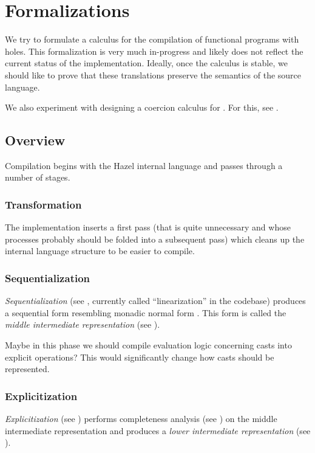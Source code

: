 \documentclass[index.tex]{subfiles}
\begin{document}
\section{Formalizations}
\label{formalization}
We try to formulate a calculus for the compilation of functional programs with holes. This
formalization is very much in-progress and likely does not reflect the current status of the
implementation. Ideally, once the calculus is stable, we should like to prove that these
translations preserve the semantics of the source language.

We also experiment with designing a coercion calculus for \Hazelnut{}. For this, see
.

\subsection{Overview}
Compilation begins with the Hazel internal language and passes through a number of stages.

\subsubsection{Transformation}
The implementation inserts a first pass (that is quite unnecessary and whose processes probably
should be folded into a subsequent pass) which cleans up the internal language structure to be
easier to compile.

\subsubsection{Sequentialization}
\emph{Sequentialization} (see , currently called ``linearization'' in
the codebase) produces a sequential form resembling monadic normal form \cite{danvy2003}. This form
is called the \emph{middle intermediate representation} (see ).

\begin{thought}
  Maybe in this phase we should compile evaluation logic concerning casts into explicit operations?
  This would significantly change how casts should be represented.
\end{thought}

\subsubsection{Explicitization}
\emph{Explicitization} (see ) performs completeness analysis (see
) on the middle intermediate representation and produces a
\emph{lower intermediate representation} (see ).




\end{document}

